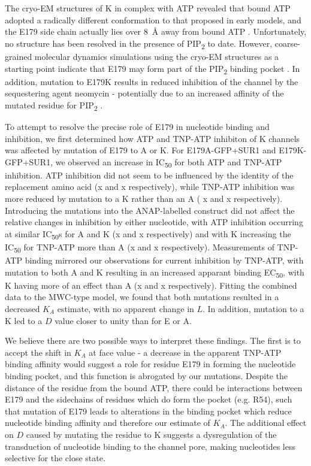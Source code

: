 The cryo-EM structures of K\ATP{} in complex with ATP revealed that bound ATP adopted a radically different conformation to that proposed in early models, and the E179 side chain actually lies over \SI{8}{\angstrom} away from bound ATP \cite{lee_molecular_2017, martin_anti-diabetic_2017, li_structure_2017, puljung_cryo-electron_2018-1}.
Unfortunately, no structure has been resolved in the presence of PIP\textsubscript{2} to date.
However, coarse-grained molecular dynamics simulations using the cryo-EM structures as a starting point indicate that E179 may form part of the PIP\textsubscript{2} binding pocket \cite{pipatpolkai_evaluating_2020}.
In addition, mutation to E179K results in reduced inhibition of the channel by the sequestering agent neomycin - potentially due to an increased affinity of the mutated residue for PIP\textsubscript{2} \cite{pipatpolkai_evaluating_2020}.

To attempt to resolve the precise role of E179 in nucleotide binding and inhibition, we first determined how ATP and TNP-ATP inhibiton of K\ATP{} channels was affected by mutation of E179 to A or K.
For E179A-GFP+SUR1 and E179K-GFP+SUR1, we observed an increase in IC\textsubscript{50} for both ATP and TNP-ATP inhibition.
ATP inhibition did not seem to be influenced by the identity of the replacement amino acid (x and x respectively), while TNP-ATP inhibition was more reduced by mutation to a K rather than an A ( x and x respectively).
Introducing the mutations into the ANAP-labelled construct did not affect the relative changes in inhibition by either nucleotide, with ATP inhibition occurring at similar IC\textsubscript{50}s for A and K (x and x respectively) and with K increasing the IC\textsubscript{50} for TNP-ATP more than A (x and x respectively).
Measurements of TNP-ATP binding mirrored our observations for current inhibition by TNP-ATP, with mutation to both A and K resulting in an increased apparant binding EC\textsubscript{50}, with K having more of an effect than A (x and x respectively).
Fitting the combined data to the MWC-type model, we found that both mutations resulted in a decreased $K_A$ estimate, with no apparent change in $L$.
In addition, mutation to a K led to a $D$ value closer to unity than for E or A.

We believe there are two possible ways to interpret these findings.
The first is to accept the shift in $K_A$ at face value - a decrease in the apparent TNP-ATP binding affinity would suggest a role for residue E179 in forming the nucleotide binding pocket, and this function is abrogated by our mutations.
Despite the distance of the residue from the bound ATP, there could be interactions between E179 and the sidechains of residues which do form the pocket (e.g. R54), such that mutation of E179 leads to alterations in the binding pocket which reduce nucleotide binding affinity and therefore our estimate of $K_A$.
The additional effect on $D$ caused by mutating the residue to K suggests a dysregulation of the transduction of nucleotide binding to the channel pore, making nucleotides less selective for the close state.

